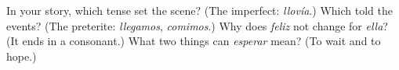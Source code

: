 \begin{tcolorbox}[breakable,colback=teal!4,colframe=teal!35!black,title={Before you move on}]
In your story, which tense set the scene? (The imperfect: \emph{llovía}.) Which told the events? (The preterite: \emph{llegamos}, \emph{comimos}.) Why does \emph{feliz} not change for \emph{ella}? (It ends in a consonant.) What two things can \emph{esperar} mean? (To wait and to hope.)
\end{tcolorbox}
